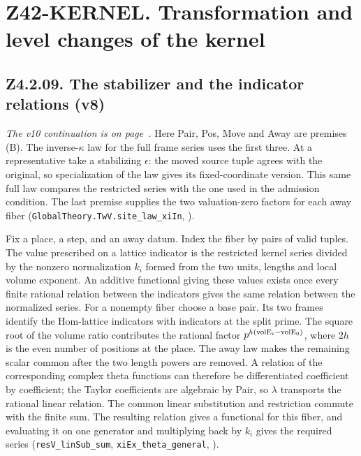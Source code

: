 \section*{Z42-KERNEL. Transformation and level changes of the kernel}

\subsection{Z4.2.09. The stabilizer and the indicator relations (v8)}\label{r6:Z4.2.09}
\emph{The v10 continuation is on page~\pageref{r8:Z4.2.09}.}
Here Pair, Pos, Move and Away are premises (B). The inverse-\(\kappa\) law for the full frame series uses the first three. At a representative take a stabilizing \(\epsilon\): the moved source tuple agrees with the original, so specialization of the law gives its fixed-coordinate version. This same full law compares the restricted series with the one used in the admission condition. The last premise supplies the two valuation-zero factors for each away fiber (\nolinkurl{GlobalTheory.TwV.site_law_xiIn}, ).

Fix a place, a step, and an away datum. Index the fiber by pairs of valid tuples. The value prescribed on a lattice indicator is the restricted kernel series divided by the nonzero normalization \(k_i\) formed from the two units, lengths and local volume exponent. An additive functional giving these values exists once every finite rational relation between the indicators gives the same relation between the normalized series. For a nonempty fiber choose a base pair. Its two frames identify the Hom-lattice indicators with indicators at the split prime. The square root of the volume ratio contributes the rational factor \(p^{h({\rm volE}_i-{\rm volE}_0)}\), where \(2h\) is the even number of positions at the place. The away law makes the remaining scalar common after the two length powers are removed. A relation of the corresponding complex theta functions can therefore be differentiated coefficient by coefficient; the Taylor coefficients are algebraic by Pair, so \(\lambda\) transports the rational linear relation. The common linear substitution and restriction commute with the finite sum. The resulting relation gives a functional for this fiber, and evaluating it on one generator and multiplying back by \(k_i\) gives the required series (\nolinkurl{resV_linSub_sum}, \nolinkurl{xiEx_theta_general}, ).

